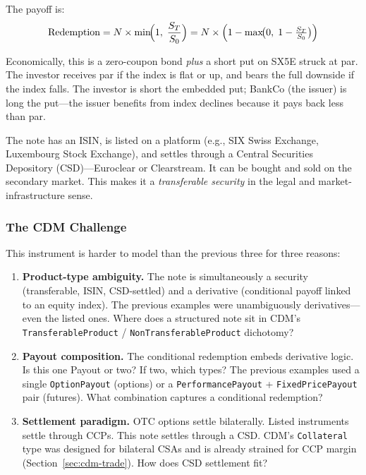 \documentclass[11pt,a4paper]{article}
\begin{document}
\noindent The payoff is:
\[
\text{Redemption} = N \times \min\!\Bigl(1,\; \frac{S_T}{S_0}\Bigr) = N \times \Bigl(1 - \max\!\bigl(0,\; 1 - \tfrac{S_T}{S_0}\bigr)\Bigr)
\]

\noindent Economically, this is a zero-coupon bond \emph{plus} a short put on SX5E struck at par. The investor receives par if the index is flat or up, and bears the full downside if the index falls. The investor is short the embedded put; BankCo (the issuer) is long the put---the issuer benefits from index declines because it pays back less than par.

The note has an ISIN, is listed on a platform (e.g., SIX Swiss Exchange, Luxembourg Stock Exchange), and settles through a Central Securities Depository (CSD)---Euroclear or Clearstream. It can be bought and sold on the secondary market. This makes it a \emph{transferable security} in the legal and market-infrastructure sense.

\subsubsection{The CDM Challenge}
\label{sec:cdm-sn-challenge}

This instrument is harder to model than the previous three for three reasons:

\begin{enumerate}
\item \textbf{Product-type ambiguity.} The note is simultaneously a security (transferable, ISIN, CSD-settled) and a derivative (conditional payoff linked to an equity index). The previous examples were unambiguously derivatives---even the listed ones. Where does a structured note sit in CDM's \texttt{TransferableProduct} / \texttt{NonTransferableProduct} dichotomy?

\item \textbf{Payout composition.} The conditional redemption embeds derivative logic. Is this one Payout or two? If two, which types? The previous examples used a single \texttt{OptionPayout} (options) or a \texttt{PerformancePayout} + \texttt{FixedPricePayout} pair (futures). What combination captures a conditional redemption?

\item \textbf{Settlement paradigm.} OTC options settle bilaterally. Listed instruments settle through CCPs. This note settles through a CSD. CDM's \texttt{Collateral} type was designed for bilateral CSAs and is already strained for CCP margin (Section~\ref{sec:cdm-trade}). How does CSD settlement fit?
\end{enumerate}
\end{document}

